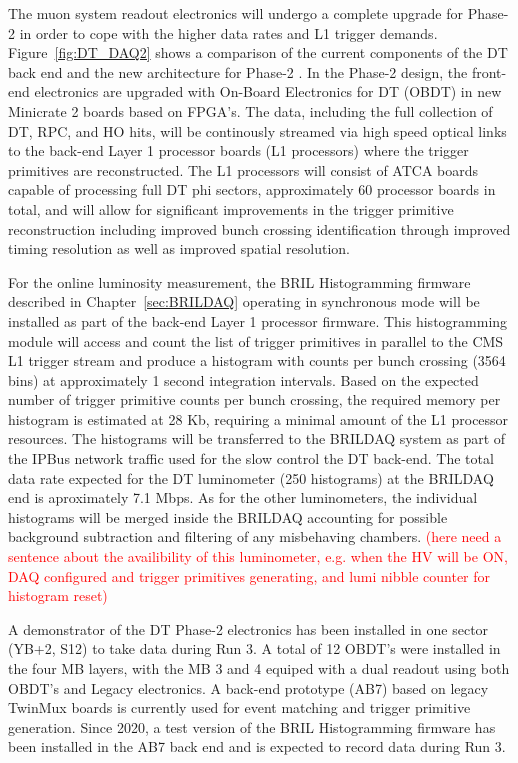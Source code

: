 The muon system readout electronics will undergo a complete upgrade for Phase-2 in order to cope with the higher data rates and L1 trigger demands.
Figure~\ref{fig:DT_DAQ2} shows a comparison of the current components of the DT back end and the new architecture for Phase-2 \cite{CERN-LHCC-2017-012}.
In the Phase-2 design, the front-end electronics are upgraded with On-Board Electronics for DT (OBDT) in new Minicrate 2 boards based on FPGA's.
The data, including the full collection of DT, RPC, and HO hits, will be continously streamed via high speed optical
links to the back-end Layer 1 processor boards (L1 processors) where the trigger primitives are reconstructed.
The L1 processors will consist of ATCA boards capable of processing full DT phi sectors, approximately 60 processor boards in total,
and will allow for significant improvements in the trigger primitive reconstruction including improved bunch crossing identification
through improved timing resolution as well as improved spatial resolution. 


For the online luminosity measurement, the BRIL Histogramming firmware described in Chapter~\ref{sec:BRILDAQ}
operating in synchronous mode will be installed as part of the back-end Layer 1 processor firmware.
This histogramming module will access and count the list of trigger primitives in parallel to the CMS L1 trigger stream
and produce a histogram with counts per bunch crossing (3564 bins) at approximately 1 second integration intervals.
Based on the expected number of trigger primitive counts per bunch crossing, the required memory per histogram is estimated at 28 Kb,
requiring a minimal amount of the L1 processor resources. 
The histograms  will be transferred to the BRILDAQ system as part of the IPBus network traffic used for the slow control the DT back-end.
The total data rate expected for the DT luminometer (250 histograms) at the BRILDAQ end is aproximately 7.1 Mbps.
As for the other luminometers, the individual histograms will be merged inside the BRILDAQ accounting for possible background subtraction and filtering of any misbehaving chambers.
\textcolor{red}{(here need a sentence about the availibility of this luminometer, e.g. when the HV will be ON, DAQ configured and trigger primitives generating, and lumi nibble counter for histogram reset)}

A demonstrator of the DT Phase-2 electronics has been installed in one sector (YB+2, S12) to take data during Run 3.
A total of 12 OBDT's were installed in the four MB layers, with the MB 3 and 4 equiped with a dual readout using both OBDT's and Legacy electronics.
A back-end prototype (AB7) based on legacy TwinMux boards is currently used for event matching and trigger primitive generation.
Since 2020, a test version of the BRIL Histogramming firmware has been installed in the AB7 back end and is expected to record data during Run 3.


